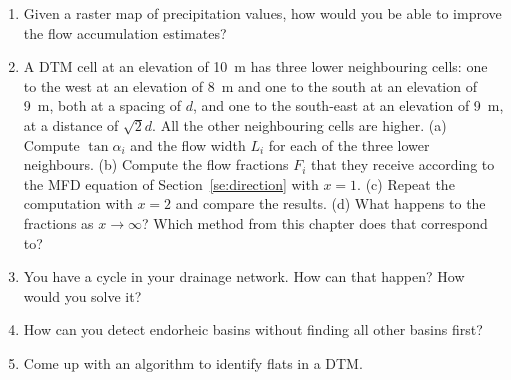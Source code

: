 \begin{enumerate}
\item Given a raster map of precipitation values, how would you be able to improve the flow accumulation estimates?
\item A DTM cell at an elevation of \SI{10}{m} has three lower neighbouring cells: one to the west at an elevation of \SI{8}{m} and one to the south at an elevation of \SI{9}{m}, both at a spacing of \(d\), and one to the south-east at an elevation of \SI{9}{m}, at a distance of \(\sqrt{2}d\). All the other neighbouring cells are higher.
(a) Compute \(\tan\alpha_i\) and the flow width \(L_i\) for each of the three lower neighbours.
(b) Compute the flow fractions \(F_i\) that they receive according to the MFD equation of Section~\ref{se:direction} with \(x = 1\).
(c) Repeat the computation with \(x = 2\) and compare the results.
(d) What happens to the fractions as \(x \to \infty\)? Which method from this chapter does that correspond to?
\item You have a cycle in your drainage network. How can that happen? How would you solve it?
\item How can you detect endorheic basins without finding all other basins first?
\item Come up with an algorithm to identify flats in a DTM\@.
\end{enumerate}
